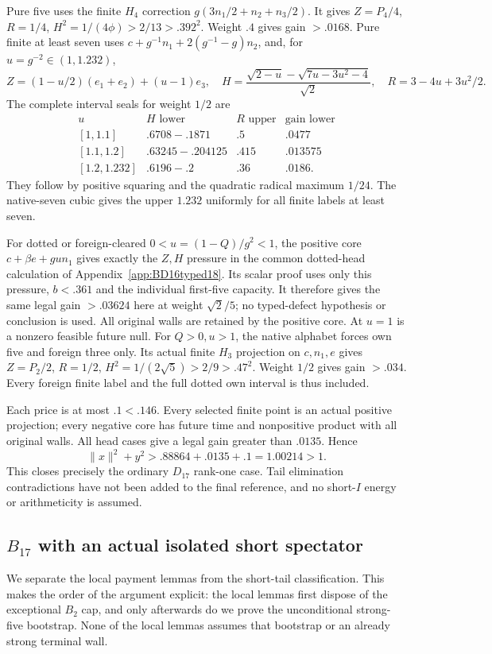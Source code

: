 \documentclass[11pt]{article}
\theoremstyle{definition}
\theoremstyle{remark}
\newcommand{\norm}[1]{\lVert #1\rVert}
\begin{document}
Pure five uses the finite \(H_4\) correction
\(g(3n_1/2+n_2+n_3/2)\). It gives \(Z=P_4/4\), \(R=1/4\),
\(H^2=1/(4\phi)>2/13>.392^2\). Weight \(.4\) gives
gain \(>.0168\). Pure finite at least seven uses
\(c+g^{-1}n_1+2(g^{-1}-g)n_2\), and, for
\(u=g^{-2}\in(1,1.232)\),
\[
 Z=(1-u/2)(e_1+e_2)+(u-1)e_3,\quad
 H={\frac{\sqrt{2-u}-\sqrt{7u-3u^2-4}}{\sqrt2}},\quad
 R=3-4u+3u^2/2.
\]
The complete interval seals for weight \(1/2\) are
\[
\begin{array}{c|c|c|c}
u& H\text{ lower}&R\text{ upper}&\text{gain lower}\\\hline
{}[1,1.1]&.6708-.1871&.5&.0477\\
{}[1.1,1.2]&.63245-.204125&.415&.013575\\
{}[1.2,1.232]&.6196-.2&.36&.0186.
\end{array}
\]
They follow by positive squaring and the quadratic radical maximum
\(1/24\). The native-seven cubic gives the upper \(1.232\)
uniformly for all finite labels at least seven.

For dotted or foreign-cleared \(0<u=(1-Q)/g^2<1\), the positive
core \(c+\beta e+gu n_1\) gives exactly the \(Z,H\)
pressure in the common dotted-head calculation of
Appendix~\ref{app:BD16typed18}. Its scalar proof uses only this
pressure, \(b<.361\) and the individual first-five capacity.
It therefore gives the same legal gain \(>.03624\) here at
weight \(\sqrt2/5\); no typed-defect hypothesis or conclusion
is used. All original walls are retained by the positive core.
At \(u=1\) is a nonzero feasible future null.
For \(Q>0,u>1\), the native alphabet forces own five and
foreign three only. Its actual finite \(H_3\) projection on
\(c,n_1,e\) gives \(Z=P_2/2\), \(R=1/2\),
\(H^2=1/(2\sqrt5)>2/9>.47^2\). Weight \(1/2\) gives
gain \(>.034\). Every foreign finite label and the full dotted
own interval is thus included.

Each price is at most \(.1<.146\). Every selected finite point
is an actual positive projection; every negative core has future
time and nonpositive product with all original walls. All head
cases give a legal gain greater than \(.0135\). Hence
\[
 \norm x^2+y^2>.88864+.0135+.1=1.00214>1.
\]
This closes precisely the ordinary \(D_{17}\) rank-one case.
Tail elimination contradictions have not been added to the final
reference, and no short-\(I\) energy or arithmeticity is assumed.

\subsection[B17 with an actual isolated short spectator]{\(B_{17}\) with an actual isolated short spectator}
\label{app:B17I18}
We separate the local payment lemmas from the short-tail classification.
This makes the order of the argument explicit: the local lemmas first
dispose of the exceptional \(B_2\) cap, and only afterwards do we prove
the unconditional strong-five bootstrap. None of the local lemmas assumes
that bootstrap or an already strong terminal wall.
\end{document}
